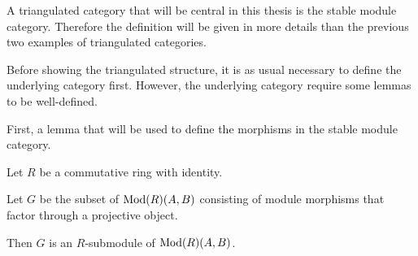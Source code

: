 
A triangulated category that will be central in this thesis is the stable module category. Therefore the definition will be given in more details than the previous two examples of triangulated categories.

Before showing the triangulated structure, it is as usual necessary to define the underlying category first. However, the underlying category require some lemmas to be well-defined.

First, a lemma that will be used to define the morphisms in the stable module category.

\begin{lemma}
    \label{lem:morphisms_factoring_through_projectives_r-submodule}
    Let \( R \) be a commutative ring with identity.

    Let \( G \) be the subset of \( \operatorname{Mod}(R)(A, B) \) consisting of module morphisms that factor through a projective object.

    Then \( G \) is an \( R \)-submodule of \( \operatorname{Mod}(R)(A, B) \).
\end{lemma}
